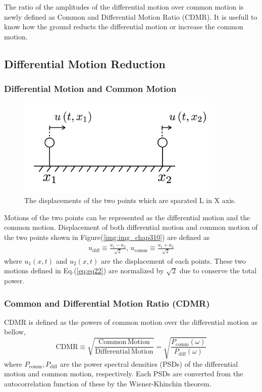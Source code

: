 The ratio of the amplitudes of the differential motion over common motion is newly defined as Common and Differential Motion Ratio (CDMR). It is usefull to know how the ground reducts the differential motion or increase the common motion. 

\subsection{Differential Motion Reduction}
\subsubsection{Differential Motion and Common Motion}


\begin{figure}[h]
  \begin{center}
    \includegraphics[width=10.0cm]{./img_chap3/img315.png}
    \caption{The displacements of the two points which are sparated L in X axis. }
  \end{center}
\end{figure}


Motions of the two points can be represented as the differential motion and the common motion. Displacement of both differential motion and common motion of the two points shown in Figure(\ref{img:img_chap310}) are defined as
\begin{eqnarray}\label{eq:eq22}
  u_{\mathrm{diff}} \equiv \frac{u_{1}-u_{2}}{\sqrt{2}}, \,
  u_{\mathrm{comm}}  \equiv \frac{u_{1}+u_{2}}{\sqrt{2}}
\end{eqnarray}
where $u_{1}(x,t)$ and $u_2(x,t)$ are the displacement of each points. These two motions defined in Eq.(\ref{eq:eq22}) are normalized by $\sqrt{2}$ due to conserve the total power.


\subsubsection{Common and Differential Motion Ratio (CDMR)}
CDMR is defined as the powers of common motion over the differential motion as bellow,
\begin{equation}
  \mathrm{CDMR} \equiv \sqrt{\frac{\mathrm{Common\,Motion}}{\mathrm{Differential\,Motion}}} = \sqrt{\frac{P_{\mathrm{comm}}(\omega)}{P_{\mathrm{diff}}(\omega)}} \label{eq:eq23}
\end{equation}
where $P_{\mathrm{comm}},P_{\mathrm{diff}}$ are the power spectral densities (PSDs) of the differential motion and common motion, respectively. Each PSDs are converted from the autocorrelation function of these by the Wiener-Khinchin theorem.


